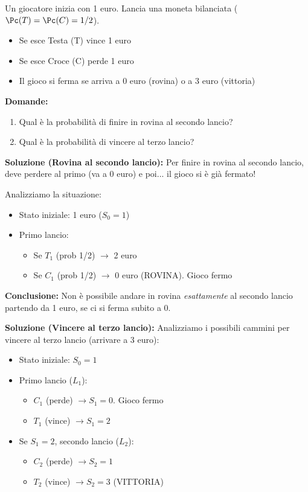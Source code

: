 \begin{exercise}
Un giocatore inizia con 1 euro. Lancia una moneta bilanciata ($\Pc(T)=\Pc(C)=1/2$).
\begin{itemize}
    \item Se esce Testa (T) vince 1 euro
    \item Se esce Croce (C) perde 1 euro
    \item Il gioco si ferma se arriva a 0 euro (rovina) o a 3 euro (vittoria)
\end{itemize}

\textbf{Domande:}
\begin{enumerate}
    \item Qual è la probabilità di finire in rovina al secondo lancio?
    \item Qual è la probabilità di vincere al terzo lancio?
\end{enumerate}

\textbf{Soluzione (Rovina al secondo lancio):}
Per finire in rovina al secondo lancio, deve perdere al primo (va a 0 euro) e poi... il gioco si è già fermato!

Analizziamo la situazione:
\begin{itemize}
    \item Stato iniziale: 1 euro ($S_0 = 1$)
    \item Primo lancio:
        \begin{itemize}
            \item Se $T_1$ (prob 1/2) $\rightarrow$ 2 euro
            \item Se $C_1$ (prob 1/2) $\rightarrow$ 0 euro (ROVINA). Gioco fermo
        \end{itemize}
\end{itemize}

\textbf{Conclusione:} Non è possibile andare in rovina \textit{esattamente} al secondo lancio partendo da 1 euro, se ci si ferma subito a 0.

\textbf{Soluzione (Vincere al terzo lancio):}
Analizziamo i possibili cammini per vincere al terzo lancio (arrivare a 3 euro):

\begin{itemize}
    \item Stato iniziale: $S_0 = 1$
    \item Primo lancio ($L_1$):
        \begin{itemize}
            \item $C_1$ (perde) $\rightarrow S_1 = 0$. Gioco fermo
            \item $T_1$ (vince) $\rightarrow S_1 = 2$
        \end{itemize}
    \item Se $S_1 = 2$, secondo lancio ($L_2$):
        \begin{itemize}
            \item $C_2$ (perde) $\rightarrow S_2 = 1$
            \item $T_2$ (vince) $\rightarrow S_2 = 3$ (VITTORIA)
        \end{itemize}
\end{itemize}


\end{exercise}
